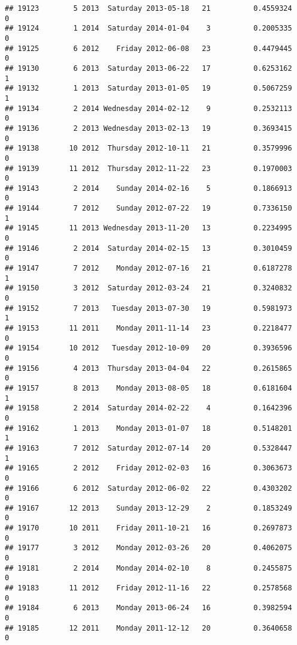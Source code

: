 \documentclass[
]{article}
\begin{document}
\begin{verbatim}
## 19123        5 2013  Saturday 2013-05-18   21          0.4559324             0
## 19124        1 2014  Saturday 2014-01-04    3          0.2005335             0
## 19125        6 2012    Friday 2012-06-08   23          0.4479445             0
## 19130        6 2013  Saturday 2013-06-22   17          0.6253162             1
## 19132        1 2013  Saturday 2013-01-05   19          0.5067259             1
## 19134        2 2014 Wednesday 2014-02-12    9          0.2532113             0
## 19136        2 2013 Wednesday 2013-02-13   19          0.3693415             0
## 19138       10 2012  Thursday 2012-10-11   21          0.3579996             0
## 19139       11 2012  Thursday 2012-11-22   23          0.1970003             0
## 19143        2 2014    Sunday 2014-02-16    5          0.1866913             0
## 19144        7 2012    Sunday 2012-07-22   19          0.7336150             1
## 19145       11 2013 Wednesday 2013-11-20   13          0.2234995             0
## 19146        2 2014  Saturday 2014-02-15   13          0.3010459             0
## 19147        7 2012    Monday 2012-07-16   21          0.6187278             1
## 19150        3 2012  Saturday 2012-03-24   21          0.3240832             0
## 19152        7 2013   Tuesday 2013-07-30   19          0.5981973             1
## 19153       11 2011    Monday 2011-11-14   23          0.2218477             0
## 19154       10 2012   Tuesday 2012-10-09   20          0.3936596             0
## 19156        4 2013  Thursday 2013-04-04   22          0.2615865             0
## 19157        8 2013    Monday 2013-08-05   18          0.6181604             1
## 19158        2 2014  Saturday 2014-02-22    4          0.1642396             0
## 19162        1 2013    Monday 2013-01-07   18          0.5148201             1
## 19163        7 2012  Saturday 2012-07-14   20          0.5328447             1
## 19165        2 2012    Friday 2012-02-03   16          0.3063673             0
## 19166        6 2012  Saturday 2012-06-02   22          0.4303202             0
## 19167       12 2013    Sunday 2013-12-29    2          0.1853249             0
## 19170       10 2011    Friday 2011-10-21   16          0.2697873             0
## 19177        3 2012    Monday 2012-03-26   20          0.4062075             0
## 19181        2 2014    Monday 2014-02-10    8          0.2455875             0
## 19183       11 2012    Friday 2012-11-16   22          0.2578568             0
## 19184        6 2013    Monday 2013-06-24   16          0.3982594             0
## 19185       12 2011    Monday 2011-12-12   20          0.3640658             0

\end{verbatim}
\end{document}
